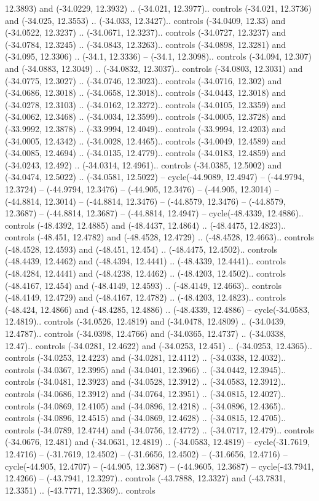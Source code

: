 \begin{scope}[shift={(2.5552, 9.9912)}]
\begin{scope}[shift={(48.1654, -14.8546)}]
12.3893) and (-34.0229, 12.3932) .. (-34.021, 12.3977).. controls (-34.021, 12.3736) and (-34.025, 12.3553) .. (-34.033, 12.3427).. controls (-34.0409, 12.33) and (-34.0522, 12.3237) .. (-34.0671, 12.3237).. controls (-34.0727, 12.3237) and (-34.0784, 12.3245) .. (-34.0843, 12.3263).. controls (-34.0898, 12.3281) and (-34.095, 12.3306) .. (-34.1, 12.3336) -- (-34.1, 12.3098).. controls (-34.094, 12.307) and (-34.0883, 12.3049) .. (-34.0832, 12.3037).. controls (-34.0803, 12.3031) and (-34.0775, 12.3027) .. (-34.0746, 12.3023).. controls (-34.0716, 12.302) and (-34.0686, 12.3018) .. (-34.0658, 12.3018).. controls (-34.0443, 12.3018) and (-34.0278, 12.3103) .. (-34.0162, 12.3272).. controls (-34.0105, 12.3359) and (-34.0062, 12.3468) .. (-34.0034, 12.3599).. controls (-34.0005, 12.3728) and (-33.9992, 12.3878) .. (-33.9994, 12.4049).. controls (-33.9994, 12.4203) and (-34.0005, 12.4342) .. (-34.0028, 12.4465).. controls (-34.0049, 12.4589) and (-34.0085, 12.4694) .. (-34.0135, 12.4779).. controls (-34.0183, 12.4859) and (-34.0243, 12.492) .. (-34.0314, 12.4961).. controls (-34.0385, 12.5002) and (-34.0474, 12.5022) .. (-34.0581, 12.5022) -- cycle(-44.9089, 12.4947) -- (-44.9794, 12.3724) -- (-44.9794, 12.3476) -- (-44.905, 12.3476) -- (-44.905, 12.3014) -- (-44.8814, 12.3014) -- (-44.8814, 12.3476) -- (-44.8579, 12.3476) -- (-44.8579, 12.3687) -- (-44.8814, 12.3687) -- (-44.8814, 12.4947) -- cycle(-48.4339, 12.4886).. controls (-48.4392, 12.4885) and (-48.4437, 12.4864) .. (-48.4475, 12.4823).. controls (-48.451, 12.4782) and (-48.4528, 12.4729) .. (-48.4528, 12.4663).. controls (-48.4528, 12.4593) and (-48.451, 12.454) .. (-48.4475, 12.4502).. controls (-48.4439, 12.4462) and (-48.4394, 12.4441) .. (-48.4339, 12.4441).. controls (-48.4284, 12.4441) and (-48.4238, 12.4462) .. (-48.4203, 12.4502).. controls (-48.4167, 12.454) and (-48.4149, 12.4593) .. (-48.4149, 12.4663).. controls (-48.4149, 12.4729) and (-48.4167, 12.4782) .. (-48.4203, 12.4823).. controls (-48.424, 12.4866) and (-48.4285, 12.4886) .. (-48.4339, 12.4886) -- cycle(-34.0583, 12.4819).. controls (-34.0526, 12.4819) and (-34.0478, 12.4809) .. (-34.0439, 12.4787).. controls (-34.0398, 12.4766) and (-34.0365, 12.4737) .. (-34.0338, 12.47).. controls (-34.0281, 12.4622) and (-34.0253, 12.451) .. (-34.0253, 12.4365).. controls (-34.0253, 12.4223) and (-34.0281, 12.4112) .. (-34.0338, 12.4032).. controls (-34.0367, 12.3995) and (-34.0401, 12.3966) .. (-34.0442, 12.3945).. controls (-34.0481, 12.3923) and (-34.0528, 12.3912) .. (-34.0583, 12.3912).. controls (-34.0686, 12.3912) and (-34.0764, 12.3951) .. (-34.0815, 12.4027).. controls (-34.0869, 12.4105) and (-34.0896, 12.4218) .. (-34.0896, 12.4365).. controls (-34.0896, 12.4515) and (-34.0869, 12.4628) .. (-34.0815, 12.4705).. controls (-34.0789, 12.4744) and (-34.0756, 12.4772) .. (-34.0717, 12.479).. controls (-34.0676, 12.481) and (-34.0631, 12.4819) .. (-34.0583, 12.4819) -- cycle(-31.7619, 12.4716) -- (-31.7619, 12.4502) -- (-31.6656, 12.4502) -- (-31.6656, 12.4716) -- cycle(-44.905, 12.4707) -- (-44.905, 12.3687) -- (-44.9605, 12.3687) -- cycle(-43.7941, 12.4266) -- (-43.7941, 12.3297).. controls (-43.7888, 12.3327) and (-43.7831, 12.3351) .. (-43.7771, 12.3369).. controls 
\end{scope}
\end{scope}
